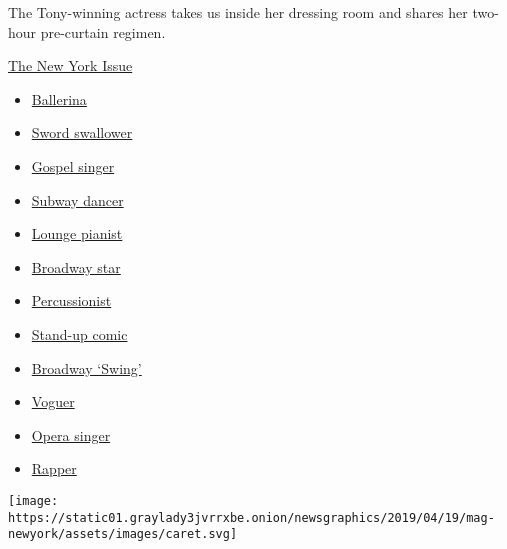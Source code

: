 The Tony-winning actress takes us inside her dressing room and shares
her two-hour pre-curtain regimen.

\href{https://www.nytimes3xbfgragh.onion/interactive/2019/05/30/magazine/performers-new-york.html}{The
New York Issue}

\begin{itemize}
\tightlist
\item
  \href{https://www.nytimes3xbfgragh.onion/interactive/2019/05/30/magazine/dance-ballet-new-york.html}{Ballerina}
\item
  \href{https://www.nytimes3xbfgragh.onion/interactive/2019/05/30/magazine/sword-swallowing-new-york.html}{Sword
  swallower}
\item
  \href{https://www.nytimes3xbfgragh.onion/interactive/2019/05/30/magazine/gospel-singer-new-york.html}{Gospel
  singer}
\item
  \href{https://www.nytimes3xbfgragh.onion/interactive/2019/05/30/magazine/subway-dance-new-york.html}{Subway
  dancer}
\item
  \href{https://www.nytimes3xbfgragh.onion/interactive/2019/05/30/magazine/earl-rose-piano-carlyle-new-york.html}{Lounge
  pianist}
\item
  \href{https://www.nytimes3xbfgragh.onion/interactive/2019/05/30/magazine/broadway-kiss-me-kate.html}{Broadway
  star}
\item
  \href{https://www.nytimes3xbfgragh.onion/interactive/2019/05/30/magazine/latin-beat-new-york.html}{Percussionist}
\item
  \href{https://www.nytimes3xbfgragh.onion/interactive/2019/05/30/magazine/female-comedy-new-york.html}{Stand-up
  comic}
\item
  \href{https://www.nytimes3xbfgragh.onion/interactive/2019/05/30/magazine/aladdin-musical-new-york.html}{Broadway
  `Swing'}
\item
  \href{https://www.nytimes3xbfgragh.onion/interactive/2019/05/30/magazine/vogue-kiki-new-york.html}{Voguer}
\item
  \href{https://www.nytimes3xbfgragh.onion/interactive/2019/05/30/magazine/metropolitan-opera-singer-new-york.html}{Opera
  singer}
\item
  \href{https://www.nytimes3xbfgragh.onion/interactive/2019/05/30/magazine/princess-nokia-new-york.html}{Rapper}
\end{itemize}

\texttt{[image: https://static01.graylady3jvrrxbe.onion/newsgraphics/2019/04/19/mag-newyork/assets/images/caret.svg]}

